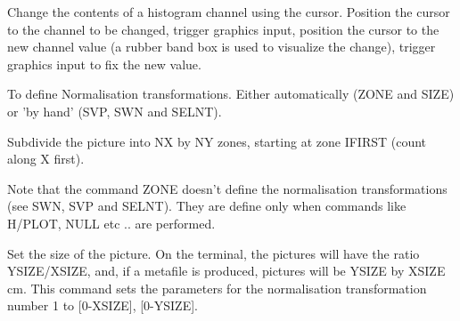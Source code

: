 \ENDCMD


   \par
Change the contents of a histogram channel using the cursor.  Position the 
   cursor to the channel to be changed, trigger graphics input, position the 
   cursor to the new channel value (a rubber band box is used to visualize the 
   change), trigger graphics input to fix the new value.  

\ENDCMD
{}
\ifMENUtext
   \par
To define Normalisation transformations.  Either automatically (ZONE and 
   SIZE) or 'by hand' (SVP, SWN and SELNT).  


\fi


\BEGARG
{}
\ENDARG
{}
\DEFOPT{\EMPTY}{}
\ENDOPT

   \par
Subdivide the picture into NX by NY zones, starting at zone IFIRST (count 
   along X first).  

   \par
Note that the command ZONE doesn't define the normalisation transformations 
   (see SWN, SVP and SELNT). They are define only when commands like H/PLOT, 
   NULL etc .. are performed.  

\ENDCMD


\BEGARG
{}
\ENDARG

   \par
Set the size of the picture.  On the terminal, the pictures will have the 
   ratio YSIZE/XSIZE, and, if a metafile is produced, pictures will be YSIZE 
   by XSIZE cm.  This command sets the parameters for the normalisation 
   transformation number 1 to [0-XSIZE], [0-YSIZE].  

\ENDCMD


